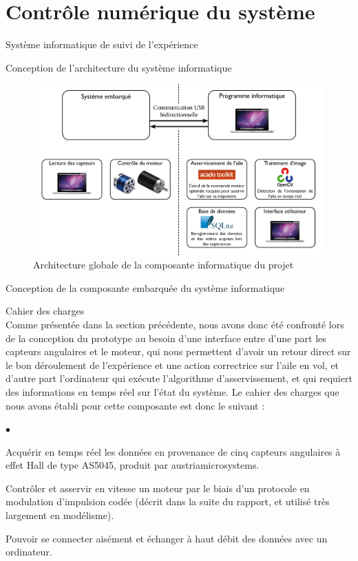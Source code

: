 \documentclass[a4paper,twoside,12pt]{article}
\newcounter{partie}
\newcounter{sous-partie}
\newenvironment{partie}[1]
{
\section{#1}
}
{

}
\newenvironment{sous-partie}[1]
{
\subsection{#1}
}
{

}
\newenvironment{sous-sous-partie}[1]
{
\subsubsection{#1}
}
{

}
\newenvironment{liste}
{
\vspace{0.2cm}
\begin{list}{$\bullet$\hspace{0.3cm}}{\leftmargin=1.4cm}
}
{
\end{list}
\vspace{0.2cm}
}
\begin{document}
\begin{partie}{Contrôle numérique du système}
\begin{sous-partie}{Système informatique de suivi de l'expérience}
\begin{sous-sous-partie}{Conception de l'architecture du système informatique}
\begin{figure}[htb]
	\centering
	\includegraphics[width=\linewidth]{./images/architecture_logicielle.jpg}
	\caption{Architecture globale de la composante informatique du projet}
	\label{archinfo}
\end{figure}

\end{sous-sous-partie}

\begin{sous-sous-partie}{Conception de la composante embarquée du système informatique}

\begin{paragraph}{Cahier des charges\vspace{0.3cm}\\}
Comme présentée dans la section précédente, nous avons donc été confronté lors de la conception du prototype au besoin d'une interface entre d'une part les capteurs angulaires et le moteur, qui nous permettent d'avoir un retour direct sur le bon déroulement de l'expérience et une action correctrice sur l'aile en vol, et d'autre part l'ordinateur qui exécute l'algorithme d'asservissement, et qui requiert des informations en temps réel sur l'état du système. %
Le cahier des charges que nous avons établi pour cette composante est donc le suivant :
\begin{liste}
\item Acquérir en temps réel les données en provenance de cinq capteurs angulaires à effet Hall de type AS5045, produit par austriamicrosystems.
\item Contrôler et asservir en vitesse un moteur par le biais d'un protocole en modulation d'impulsion codée (décrit dans la suite du rapport, et utilisé très largement en modélisme).
\item Pouvoir se connecter aisément et échanger à haut débit des données avec un ordinateur.
\end{liste}
\end{paragraph}


\end{sous-sous-partie}
\end{sous-partie}
\end{partie}
\end{document}
